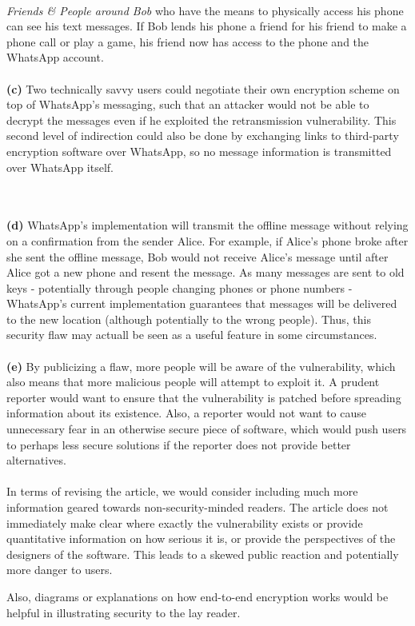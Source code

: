 \documentclass[11pt]{article}
\begin{document}
\\ \textit{Friends \& People around Bob} who have the means to physically access his phone can see his text messages. If Bob lends his phone a friend for his friend to make a phone call or play a game, his friend now has access to the phone and the WhatsApp account. 
\\
\\ \textbf{(c)} Two technically savvy users could negotiate their own encryption scheme on top of WhatsApp's messaging, such that an attacker would not be able to decrypt the messages even if he exploited the retransmission vulnerability. This second level of indirection could also be done by exchanging links to third-party encryption software over WhatsApp, so no message information is transmitted over WhatsApp itself.

\\ 
\\ \textbf{(d)} WhatsApp's implementation will transmit the offline message without relying on a confirmation from the sender Alice. For example, if Alice's phone broke after she sent the offline message, Bob would not receive Alice's message until after Alice got a new phone and resent the message. As many messages are sent to old keys - potentially through people changing phones or phone numbers - WhatsApp's current implementation guarantees that messages will be delivered to the new location (although potentially to the wrong people). Thus, this security flaw may actuall be seen as a useful feature in some circumstances. 
\\
\\ \textbf{(e)} By publicizing a flaw, more people will be aware of the vulnerability, which also means that more malicious people will attempt to exploit it. A prudent reporter would want to ensure that the vulnerability is patched before spreading information about its existence. Also, a reporter would not want to cause unnecessary fear in an otherwise secure piece of software, which would push users to perhaps less secure solutions if the reporter does not provide better alternatives. 
\\
\\In terms of revising the article, we would consider including much more information geared towards non-security-minded readers. The article does not immediately make clear where exactly the vulnerability exists or provide quantitative information on how serious it is, or provide the perspectives of the designers of the software. This leads to a skewed public reaction and potentially more danger to users.

Also, diagrams or explanations on how end-to-end encryption works would be helpful in illustrating security to the lay reader. 
\end{document}
